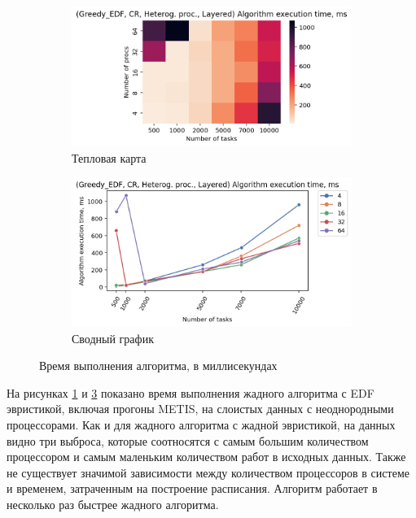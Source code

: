 \begin{figure}[!htbp]
    \centering
    \begin{subfigure}{0.49\textwidth}
        \includegraphics[width=\textwidth]{imgs/unbalanced/CR_EDF/et_heatmap.png}
        \caption{Тепловая карта}
        \label{fig:CR-unbalanced-EDF-exec-time-heatmap}
    \end{subfigure}
    \hfill
    \begin{subfigure}{0.49\textwidth}
        \includegraphics[width=\textwidth]{imgs/unbalanced/CR_EDF/tr_graph.png}
        \caption{Сводный график}
        \label{fig:CR-unbalanced-EDF-exec-time-compiled}
    \end{subfigure}
    \caption{Время выполнения алгоритма, в миллисекундах}
\end{figure}

На рисунках \ref{fig:CR-unbalanced-EDF-exec-time-heatmap} и \ref{fig:CR-unbalanced-EDF-exec-time-compiled} показано время выполнения жадного алгоритма с EDF эвристикой, включая прогоны METIS, на слоистых данных с неоднородными процессорами. Как и для жадного алгоритма с жадной эвристикой, на данных видно три выброса, которые соотносятся с самым большим количеством процессором и самым маленьким количеством работ в исходных данных. Также не существует значимой зависимости между количеством процессоров в системе и временем, затраченным на построение расписания. Алгоритм работает в несколько раз быстрее жадного алгоритма.

